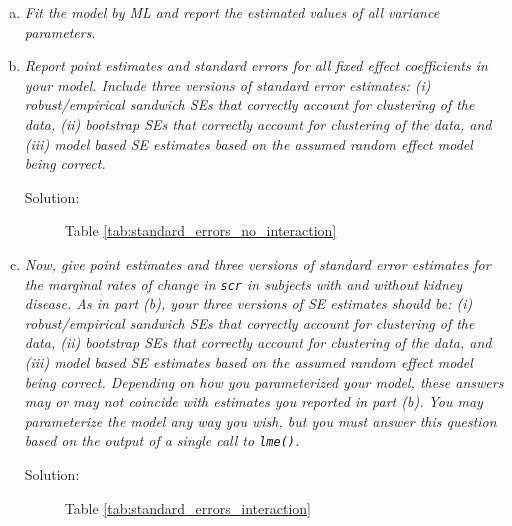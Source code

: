 \documentclass[11pt, letterpaper]{article}
\begin{document}
\begin{enumerate}[(a)]
\item {\em Fit the model by ML and
report the
estimated values of all variance parameters. }

\item {\em  Report point estimates and standard errors for all fixed effect
coefficients in your model.  Include three versions of standard error estimates: (i) robust/empirical sandwich SEs that correctly
account for clustering of the data, (ii) bootstrap SEs that correctly account for clustering of the data, and (iii) model based SE estimates based on the assumed random effect model being correct.}



\begin{description}
\item[Solution:] Table \ref{tab:standard_errors_no_interaction}
\end{description}

\item {\em  Now, give point estimates and three versions of standard error estimates for the marginal rates of change in \texttt{scr} in subjects with and without 
kidney disease.  As in part (b), your three versions of SE estimates should be:  (i) robust/empirical sandwich SEs that correctly
account for clustering of the data, (ii) bootstrap SEs that correctly account for clustering of the data, and (iii) model based SE estimates based on the assumed random effect model being correct.  Depending on how you parameterized your model, these answers may or may not 
coincide with estimates you reported in part (b).  You may parameterize the model any way you wish,
but you must answer this question based on the output of a single call to \texttt{lme()}.}



\begin{description}
\item[Solution:] Table \ref{tab:standard_errors_interaction}
\end{description}

\end{enumerate}
\end{document}
